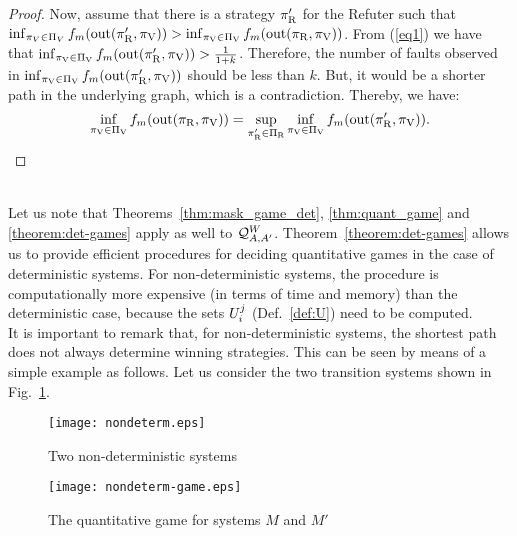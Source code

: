 \begin{proof}
Now, assume that there is a strategy $\pi_{\mathrm{R}}'$ for the Refuter such that 
$\inf_{\pi_V \in \Pi_V} f_m (\operatorname{out}(\pi_{\mathrm{R}}', \pi_{\mathrm{V}})) > \inf_{\pi_{\mathrm{V}} \in \Pi_{\mathrm{V}}} f_m (\operatorname{out}(\pi_{\mathrm{R}}, \pi_{\mathrm{V}}))$.
From (\ref{eq1}) we have that $\inf_{\pi_{\mathrm{V}} \in \Pi_{\mathrm{V}}} f_m(\operatorname{out}(\pi_{\mathrm{R}}', \pi_{\mathrm{V}})) > \frac{1}{1+k}$. 
Therefore, the number of faults observed in 
$\inf_{\pi_{\mathrm{V}} \in \Pi_{\mathrm{V}}} f_m(\operatorname{out}(\pi_{\mathrm{R}}', \pi_{\mathrm{V}}))$ should be less than $k$. 
But, it would be a shorter path in the underlying graph, which is a contradiction. Thereby, we have:
\[	
	\inf_{\pi_{\mathrm{V}} \in \Pi_{\mathrm{V}}} f_m(\operatorname{out}(\pi_{\mathrm{R}}, \pi_{\mathrm{V}})) = \sup_{\pi_{\mathrm{R}}' \in \Pi_{\mathrm{R}}} \inf_{\pi_{\mathrm{V}} \in \Pi_{\mathrm{V}}} f_m( \operatorname{out}(\pi_{\mathrm{R}}',\pi_{\mathrm{V}})).
\]	
\qedhere
\end{proof} \\

	Let us note that Theorems~\ref{thm:mask_game_det}, \ref{thm:quant_game} and \ref{theorem:det-games} apply as well to 
$\mathcal{Q}^W_{A,A'}$.
	Theorem~\ref{theorem:det-games} allows us to provide efficient procedures for deciding quantitative games in the 
case of deterministic systems. For non-deterministic systems, the procedure is computationally more
expensive (in terms of time and memory) than the deterministic case, because 
the sets $U^j_i$ (Def.~\ref{def:U}) need to be computed. \\

It is important to remark that, for non-deterministic systems, the shortest path does not always determine winning strategies. This can be seen by means of a simple example as follows. Let us consider the two transition systems shown in Fig.~\ref{fig:two-nondet-systems}.

\begin{figure} [h]
\begin{center}
    \texttt{[image: nondeterm.eps]} 
    \caption{Two non-deterministic systems}
    \label{figure:nondeterm}\label{fig:two-nondet-systems}
\end{center}
\end{figure}
\begin{figure} [h]
\begin{center}
    \texttt{[image: nondeterm-game.eps]} 
    \caption{The quantitative game for systems $M$ and $M'$}
    \label{figure:nondeterm-game}
\end{center}
\end{figure}

